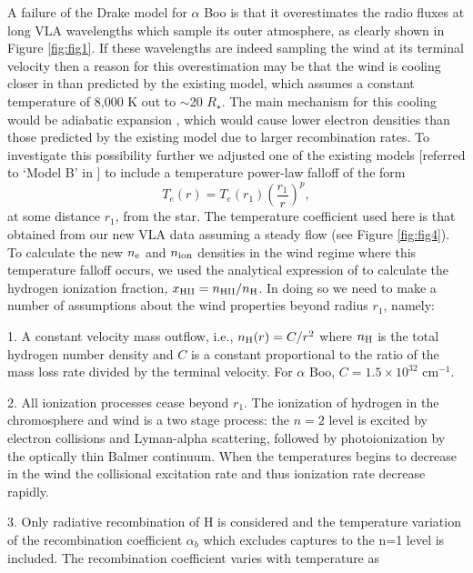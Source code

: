\documentclass[iop]{emulateapj}
\begin{document}
A failure of the Drake model for $\alpha$ Boo is that it overestimates the radio fluxes at long VLA wavelengths which sample its outer atmosphere, as clearly shown in Figure \ref{fig:fig1}. If these wavelengths are indeed sampling the wind at its terminal velocity then a reason for this overestimation may be that the wind is cooling closer in than predicted by the existing model, which assumes a constant temperature of 8,000 K out to $\sim$20 $R_{\star}$. The main mechanism for this cooling would be adiabatic expansion \citep{2011ASPC..448..691O}, which would cause lower electron densities than those predicted by the existing model due to larger recombination rates. To investigate this possibility further we adjusted one of the existing models [referred to `Model B' in \cite{1985pssl.proc..351D}] to include a temperature power-law falloff of the form
\begin{equation}
T_{e}(r)= T_{e}(r_{1})\left(\frac{r_{1}}{r}\right)^{p},
\label{eq:eq2}
\end{equation}
at some distance $r_{1}$, from the star. The temperature coefficient used here is that obtained from our new VLA data assuming a steady flow (see Figure \ref{fig:fig4}). To calculate the new $n_{\rm{e}}$ and $n_{\rm{ion}}$ densities in the wind regime where this temperature falloff occurs, we used the analytical expression of \cite{1986ApJ...306..605G} to calculate the hydrogen ionization fraction, $x_{\rm{HII}}=n_{\rm{HII}}/n_{\rm{H}}$. In doing so we need to make a number of assumptions about the wind properties beyond radius $r_{1}$, namely:
\item 1. A constant velocity mass outflow, i.e., $n_{\rm{H}}(r)=C/r^2$ where $n_{\rm{H}}$ is the total hydrogen number density and $C$ is a constant proportional to the ratio of the mass loss rate divided by the terminal velocity. For $\alpha$ Boo, $C = 1.5 \times 10^{32} $ cm$^{-1}$.
\item 2. All ionization processes cease beyond $r_{1}$. The ionization of hydrogen in the chromosphere and wind is a two stage process: the $n = 2$ level is excited by electron collisions and Lyman-alpha scattering, followed by photoionization by the optically thin Balmer continuum. When the temperatures begins to decrease in the wind the collisional excitation rate and thus ionization rate decrease rapidly.
\item 3. Only radiative recombination of H is considered and the temperature variation of the recombination coefficient $\alpha _{b}$ which excludes captures to the n=1 level \citep{1978ppim.book.....S} is included. The recombination coefficient varies with temperature as
\end{document}
